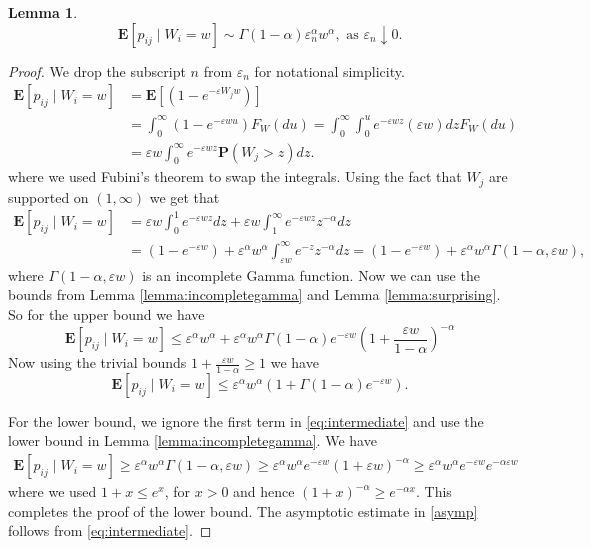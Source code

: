 \documentclass[11pt, reqno]{amsart}
\numberwithin{equation}{section}
\theoremstyle{plain} %
\newtheorem{lemma}[theorem]{Lemma}
\theoremstyle{definition} %
\newcommand{\eps}{\varepsilon}
\newcommand{\prob}{\mathbf{P}}
\newcommand{\E}{\mathbf{E}}
\begin{document}
{\begin{lemma}
 \begin{equation}\label{asymp}\E[ p_{ij}\mid W_i=w]\sim \Gamma(1-\alpha)\eps_n^{\alpha} w^{\alpha}, \text{ as $\eps_n\downarrow 0$}.\end{equation}
\end{lemma}
\begin{proof}
We drop the subscript $n$ from $\eps_n$ for notational simplicity.
\begin{align*}
    \E[ p_{ij}\mid W_i=w]&=  \E\left[ \left(1-e^{-\eps W_j w}\right)\right]\\
    &= \int_0^\infty (1-e^{-\eps w u}) F_W(du)= \int_0^\infty \int_0^u e^{-\eps w z} (\eps w) dz F_W(du)\\
    &= \eps w \int_0^\infty e^{-\eps w z}\prob(W_j>z) dz.
\end{align*}
where we used Fubini's theorem to swap the integrals. Using the fact that $W_j$ are supported on $(1,\infty)$ we get that
\begin{align}
    \E[ p_{ij}\mid W_i=w]&=\eps w \int_0^1 e^{-\eps w z} dz+  \eps w\int_1^\infty e^{-\eps w z}z^{-\alpha} dz\nonumber\\
    &=(1-e^{-\eps w})+  \eps^\alpha w^\alpha \int_{\eps w}^\infty e^{-z}z^{-\alpha} dz=  (1-e^{-\eps w}) + \eps^\alpha w^\alpha \Gamma(1-\alpha, \eps w), \label{eq:intermediate}
\end{align}
where $\Gamma(1-\alpha, \eps w)$ is an incomplete Gamma function. Now we can use the bounds from Lemma \ref{lemma:incompletegamma} and Lemma \ref{lemma:surprising}. So for the upper bound we have
$$ \E[ p_{ij}\mid W_i=w]\le \eps^{\alpha}w^{\alpha}+ \eps^\alpha w^\alpha \Gamma(1-\alpha) e^{-\eps w}\left( 1+ \frac{\eps w}{1-\alpha}\right)^{-\alpha}$$
Now using the trivial bounds  $1+ \frac{\eps w}{1-\alpha}\ge 1$ we have
$$\E[ p_{ij}\mid W_i=w]\le \eps^{\alpha} w^{\alpha}(1+\Gamma(1-\alpha) e^{-\eps w}).$$

For the lower bound, we ignore the first term in \eqref{eq:intermediate} and use the lower bound in Lemma \ref{lemma:incompletegamma}. We have 
\begin{align*}
  \E[ p_{ij}\mid W_i=w]\ge \eps^\alpha w^{\alpha}\Gamma(1-\alpha, \eps w)
  \ge \eps^{\alpha} w^\alpha e^{-\eps w}(1+\eps w)^{-\alpha}\ge \eps^{\alpha}  w^{\alpha} e^{-\eps w}e^{-\alpha \eps w}
\end{align*}
where we used $1+x\le e^x$, for $x>0$ and hence $(1+x)^{-\alpha}\ge e^{-\alpha x}$. This completes the proof of the lower bound. The asymptotic estimate in \eqref{asymp} follows from \eqref{eq:intermediate}.
\end{proof}



}
\end{document}
